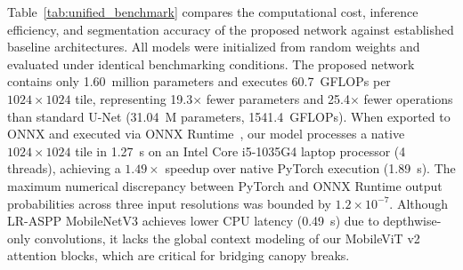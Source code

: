 \documentclass{ieeeaccess}
\begin{document}
Table~\ref{tab:unified_benchmark} compares the computational cost, inference efficiency, and segmentation accuracy of the proposed network against established baseline architectures. All models were initialized from random weights and evaluated under identical benchmarking conditions. The proposed network contains only 1.60~million parameters and executes 60.7~GFLOPs per $1024 \times 1024$ tile, representing 19.3$\times$ fewer parameters and 25.4$\times$ fewer operations than standard U-Net (31.04~M parameters, 1541.4~GFLOPs). When exported to ONNX and executed via ONNX Runtime~\cite{onnxruntime}, our model processes a native $1024 \times 1024$ tile in 1.27~s on an Intel Core i5-1035G4 laptop processor (4 threads), achieving a $1.49\times$ speedup over native PyTorch execution (1.89~s). The maximum numerical discrepancy between PyTorch and ONNX Runtime output probabilities across three input resolutions was bounded by $1.2 \times 10^{-7}$. Although LR-ASPP MobileNetV3 achieves lower CPU latency (0.49~s) due to depthwise-only convolutions, it lacks the global context modeling of our MobileViT v2 attention blocks, which are critical for bridging canopy breaks.
\end{document}
